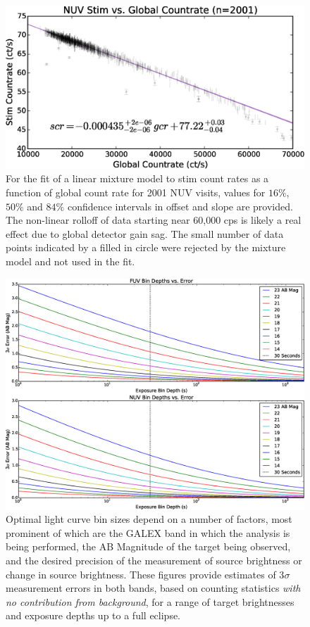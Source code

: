 \documentclass[preprint]{aastex}
\begin{document}
\begin{figure}
\includegraphics[scale=0.9]{Fig17.eps}
\caption{For the fit of a linear mixture model to stim count rates as a function of global count rate for 2001 NUV visits, values for $16\%$, $50\%$ and $84\%$ confidence intervals in offset and slope are provided. The non-linear rolloff of data starting near 60,000 cps is likely a real effect due to global detector gain sag. The small number of data points indicated by a filled in circle were rejected by the mixture model and not used in the fit.
\label{nuvstim}}
\end{figure}


\begin{figure}
\includegraphics[scale=0.49]{Fig18.eps}
\caption{Optimal light curve bin sizes depend on a number of factors, most prominent of which are the GALEX band in which the analysis is being performed, the AB Magnitude of the target being observed, and the desired precision of the measurement of source brightness or change in source brightness. These figures provide estimates of 3$\sigma$ measurement errors in both bands, based on counting statistics \emph{with no contribution from background}, for a range of target brightnesses and exposure depths up to a full eclipse.
\label{sigmadetlim}}
\end{figure}
\end{document}
